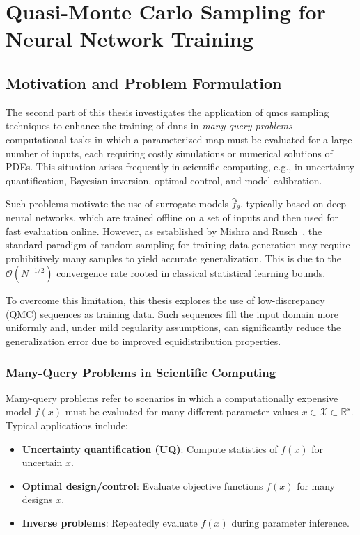 \part{Quasi-Monte Carlo Sampling for Neural Network Training}
\label{part2}

\chapter{Motivation and Problem Formulation}
\label{chapter4}

The second part of this thesis investigates the application of \acfp{qmc}
sampling techniques to enhance the training of \acfp{dnn} in \emph{many-query
problems}—computational tasks in which a parameterized map must be evaluated for
a large number of inputs, each requiring costly simulations or numerical
solutions of PDEs. This situation arises frequently in scientific computing,
e.g., in uncertainty quantification, Bayesian inversion, optimal control, and
model calibration.

Such problems motivate the use of surrogate models $\hat{f}_\theta$, typically
based on deep neural networks, which are trained offline on a set of inputs and
then used for fast evaluation online. However, as established by Mishra and
Rusch~\cite{mishra2020enhancing}, the standard paradigm of random sampling for
training data generation may require prohibitively many samples to yield
accurate generalization. This is due to the $\mathcal{O}(N^{-1/2})$ convergence
rate rooted in classical statistical learning bounds.

To overcome this limitation, this thesis explores the use of low-discrepancy
(QMC) sequences as training data. Such sequences fill the input domain more
uniformly and, under mild regularity assumptions, can significantly reduce the
generalization error due to improved equidistribution properties.

\section{Many-Query Problems in Scientific Computing}
Many-query problems refer to scenarios in which a computationally expensive
model $f(x)$ must be evaluated for many different parameter values $x \in
\mathcal{X} \subset \mathbb{R}^s$. Typical applications include:
\begin{itemize}
  \item \textbf{Uncertainty quantification (UQ)}: Compute statistics of $f(x)$
  for uncertain $x$.
  \item \textbf{Optimal design/control}: Evaluate objective functions $f(x)$ for
  many designs $x$.
  \item \textbf{Inverse problems}: Repeatedly evaluate $f(x)$ during parameter
  inference.
\end{itemize}

